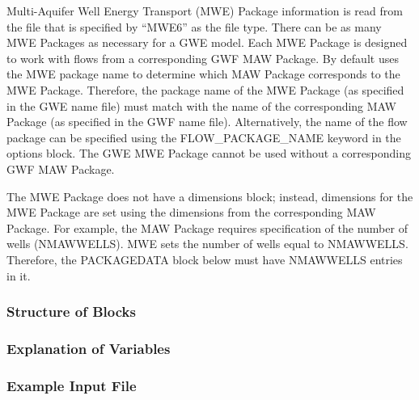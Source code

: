 Multi-Aquifer Well Energy Transport (MWE) Package information is read from the file that is specified by ``MWE6'' as the file type.  There can be as many MWE Packages as necessary for a GWE model. Each MWE Package is designed to work with flows from a corresponding GWF MAW Package. By default \mf uses the MWE package name to determine which MAW Package corresponds to the MWE Package.  Therefore, the package name of the MWE Package (as specified in the GWE name file) must match with the name of the corresponding MAW Package (as specified in the GWF name file).  Alternatively, the name of the flow package can be specified using the FLOW\_PACKAGE\_NAME keyword in the options block.  The GWE MWE Package cannot be used without a corresponding GWF MAW Package.

The MWE Package does not have a dimensions block; instead, dimensions for the MWE Package are set using the dimensions from the corresponding MAW Package.  For example, the MAW Package requires specification of the number of wells (NMAWWELLS).  MWE sets the number of wells equal to NMAWWELLS.  Therefore, the PACKAGEDATA block below must have NMAWWELLS entries in it.

\vspace{5mm}
\subsubsection{Structure of Blocks}




\vspace{5mm}
\subsubsection{Explanation of Variables}
\begin{description}

\end{description}

\vspace{5mm}
\subsubsection{Example Input File}


\vspace{5mm}
